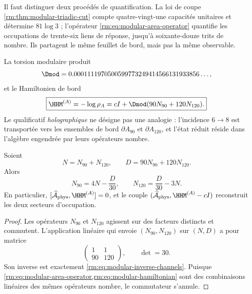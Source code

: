 Il faut distinguer deux procédés de quantification. La loi de coupe \cref{rm:thm:modular-triadic-cut} compte quatre-vingt-une capacités unitaires et détermine \(81\log3\) ; l’opérateur \cref{rm:eq:modular-area-operator} quantifie les occupations de trente-six liens de réponse, jusqu’à soixante-douze trits de nombre. Ils partagent le même feuillet de bord, mais pas la même observable.

La torsion modulaire produit
\begin{equation}
\label{rm:eq:modular-delta-value}
\Dmod
=0.0001111970500599773249414566131933856\ldots,
\end{equation}
et le Hamiltonien de bord
\begin{equation}
\label{rm:eq:modular-hamiltonian}
\boxed{
\HHM^{(A)}=-\log\rho_A
=cI+\Dmod(90N_{90}+120N_{120}).}
\end{equation}
Le qualificatif \emph{holographique} ne désigne pas une analogie : l’incidence \(6\to8\) est transportée vers les ensembles de bord \(\partial A_{90}\) et \(\partial A_{120}\), et l’état réduit réside dans l’algèbre engendrée par leurs opérateurs nombre.

\begin{theorem}
\label{rm:thm:modular-area-memory}
Soient
\begin{equation}
\label{rm:eq:modular-ND}
N=N_{90}+N_{120},
\qquad
D=90N_{90}+120N_{120}.
\end{equation}
Alors
\begin{equation}
\label{rm:eq:modular-inverse-channels}
\boxed{
N_{90}=4N-\frac{D}{30},
\qquad
N_{120}=\frac{D}{30}-3N.}
\end{equation}
En particulier, \([\widehat{\mathcal A}_{\rm phys},\HHM^{(A)}]=0\), et le couple \((\widehat{\mathcal A}_{\rm phys},\HHM^{(A)}-cI)\) reconstruit les deux secteurs d’occupation.
\end{theorem}

\begin{proof}
Les opérateurs \(N_{90}\) et \(N_{120}\) agissent sur des facteurs distincts et commutent. L’application linéaire qui envoie \((N_{90},N_{120})\) sur \((N,D)\) a pour matrice
\[
\begin{pmatrix}1&1\\90&120\end{pmatrix},
\qquad \det=30.
\]
Son inverse est exactement \cref{rm:eq:modular-inverse-channels}. Puisque \cref{rm:eq:modular-area-operator,rm:eq:modular-hamiltonian} sont des combinaisons linéaires des mêmes opérateurs nombre, le commutateur s’annule.
\end{proof}

